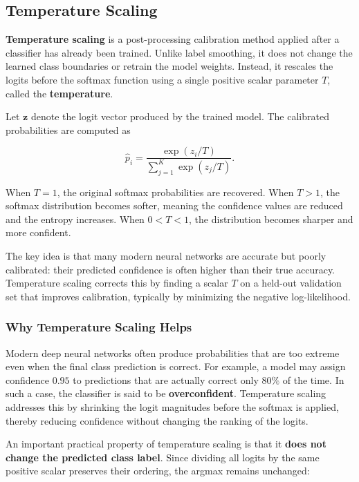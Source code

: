 \documentclass{article}
\begin{document}
\subsection{Temperature Scaling}

\textbf{Temperature scaling} is a post-processing calibration method applied after a classifier has already been trained. Unlike label smoothing, it does not change the learned class boundaries or retrain the model weights. Instead, it rescales the logits before the softmax function using a single positive scalar parameter \(T\), called the \textbf{temperature}.

Let \(\mathbf{z}\) denote the logit vector produced by the trained model. The calibrated probabilities are computed as

\[
\hat{p}_i = \frac{\exp(z_i/T)}{\sum_{j=1}^{K}\exp(z_j/T)}.
\]

When \(T=1\), the original softmax probabilities are recovered. When \(T>1\), the softmax distribution becomes softer, meaning the confidence values are reduced and the entropy increases. When \(0<T<1\), the distribution becomes sharper and more confident.

The key idea is that many modern neural networks are accurate but poorly calibrated: their predicted confidence is often higher than their true accuracy. Temperature scaling corrects this by finding a scalar \(T\) on a held-out validation set that improves calibration, typically by minimizing the negative log-likelihood.

\subsubsection*{Why Temperature Scaling Helps}

Modern deep neural networks often produce probabilities that are too extreme even when the final class prediction is correct. For example, a model may assign confidence \(0.95\) to predictions that are actually correct only \(80\%\) of the time. In such a case, the classifier is said to be \textbf{overconfident}. Temperature scaling addresses this by shrinking the logit magnitudes before the softmax is applied, thereby reducing confidence without changing the ranking of the logits.

An important practical property of temperature scaling is that it \textbf{does not change the predicted class label}. Since dividing all logits by the same positive scalar preserves their ordering, the argmax remains unchanged:
\end{document}
